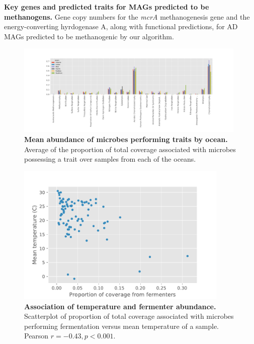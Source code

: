 \documentclass[10pt,letterpaper]{article}
\begin{document}
\begin{table}
\scriptsize
{}

\caption{{\bf Key genes and predicted traits for MAGs predicted to be methanogens.}
Gene copy numbers for the \emph{mcrA} methanogenesis gene and the energy-converting hyrdogenase A, along with functional predictions, for AD MAGs predicted to be methanogenic by our algorithm.}\label{tab3}
\end{table}

\begin{figure}
\includegraphics[width=0.98\textwidth]{oceans}
\caption{{\bf Mean abundance of microbes performing traits by ocean.}
Average of the proportion of total coverage associated with microbes possessing a trait over samples from each of the oceans.}
\label{oceans}
\end{figure}

\begin{figure}
\includegraphics[width=0.9\textwidth]{temp_corr_tara}
\caption{{\bf Association of temperature and fermenter abundance.}
Scatterplot of proportion of total coverage associated with microbes performing fermentation versus mean temperature of a sample. Pearson $r=-0.43, p<0.001$.}
\label{corr_tara}
\end{figure}
\end{document}
